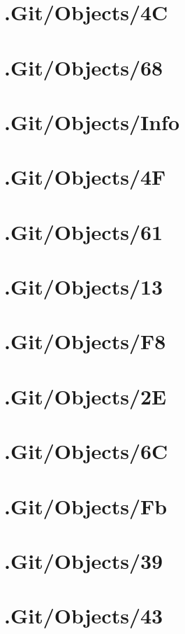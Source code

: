 \section*{.Git/Objects/4C}

\section*{.Git/Objects/68}

\section*{.Git/Objects/Info}

\section*{.Git/Objects/4F}

\section*{.Git/Objects/61}

\section*{.Git/Objects/13}

\section*{.Git/Objects/F8}

\section*{.Git/Objects/2E}

\section*{.Git/Objects/6C}

\section*{.Git/Objects/Fb}

\section*{.Git/Objects/39}

\section*{.Git/Objects/43}

